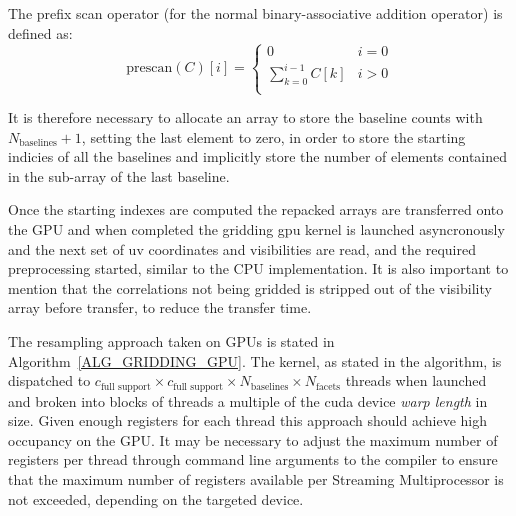 The prefix scan operator (for the normal binary-associative addition operator) is defined as:
\begin{equation}
 \text{prescan}(C)[i] = 
			\begin{cases}
			  0 & i = 0 \\
			  \sum_{k=0}^{i-1}{C[k]} & i > 0 \\
			\end{cases}
\end{equation}

It is therefore necessary to allocate an array to store the baseline counts with $N_\text{baselines} + 1$, setting the last element to zero,
in order to store the starting indicies of all the baselines and implicitly store the number of elements contained in the sub-array of the last
baseline.

Once the starting indexes are computed the repacked arrays are transferred onto the GPU and when completed the gridding gpu kernel is 
launched asyncronously and the next set of uv coordinates and visibilities are read, and the required preprocessing started, similar 
to the CPU implementation. It is also important to mention that the correlations not being gridded is stripped out of the visibility 
array before transfer, to reduce the transfer time.

The resampling approach taken on GPUs is stated in Algorithm~\ref{ALG_GRIDDING_GPU}. The kernel, as stated in the algorithm, is dispatched to 
$c_\text{full support}\times c_\text{full support}\times N_\text{baselines}\times N_\text{facets}$ threads when launched and broken
into blocks of threads a multiple of the cuda device \textit{warp length} in size. Given enough registers for each thread this approach
should achieve high occupancy on the GPU. It may be necessary to adjust the maximum number of registers per thread through command line 
arguments to the compiler to ensure that the maximum number of registers available per Streaming Multiprocessor is not exceeded, depending on
the targeted device.

